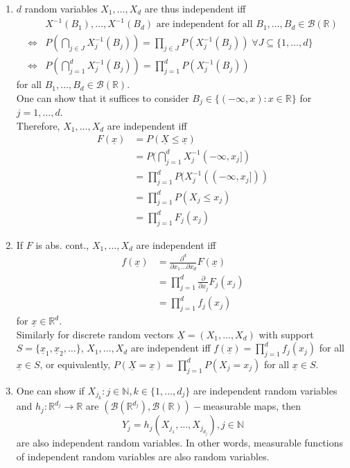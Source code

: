 \documentclass{article}
\newcommand{\R}{\mathbb{R}}
\newcommand{\N}{\mathbb{N}}
\newcommand{\inv}{^{-1}}
\begin{document}
	\begin{myrem}{}{}
		\begin{enumerate}
			\item $d$ random variables $X_1, \dots, X_d$ are thus independent iff
			\begin{align*}
				&X\inv(B_1), \dots, X\inv(B_d)\mbox{ are independent for all }B_1, \dots, B_d\in\mathcal{B}(\R)\\
				\Leftrightarrow&P(\bigcap_{j\in J}X_j\inv(B_j))=\prod_{j\in J}P(X_j\inv(B_j))\;\forall J\subseteq\{1, \dots, d\}\\
				\Leftrightarrow&P(\bigcap_{j=1}^{d}X_j\inv(B_j))=\prod_{j=1}^{d}P(X_j\inv(B_j))
			\end{align*}
			for all $B_1, \dots, B_d\in\mathcal{B}(\R)$.\\
			
			One can show that it suffices to consider $B_j\in\{(-\infty, x) : x\in\R\}$ for $j=1, \dots, d$.\\
			
			Therefore, $X_1, \dots, X_d$ are independent iff
			\begin{align*}
				F(\underline{x})&=P(\underline{X}\leq \underline{x})\\
				&=P(\bigcap_{j=1}^{d}X_j\inv(-\infty, x_j])\\
				&=\prod_{j=1}^{d}P(X_j\inv((-\infty, x_j]))\\
				&=\prod_{j=1}^{d}P(X_j\leq x_j)\\
				&=\prod_{j=1}^{d}F_j(x_j)
			\end{align*}
			
			\item If $F$ is abs. cont., $X_1, \dots, X_d$ are independent iff
				\begin{align*}
					f(\underline{x})&=\frac{\partial^d}{\partial x_1\dots\partial x_d}F(\underline{x})\\
					&=\prod_{j=1}^{d}\frac{\partial}{\partial x_j}F_j(x_j)\\
					&=\prod_{j=1}^{d}f_j(x_j)
				\end{align*}
				for $\underline{x}\in \R^d$.\\
				
				Similarly for discrete random vectors $\underline{X}=(X_1, \dots, X_d)$ with support $S=\{\underline{x}_1, \underline{x}_2, \dots\}$, $X_1, \dots, X_d$ are independent iff $f(\underline{x})=\prod_{j=1}^{d}f_j(x_j)$ for all $\underline{x}\in S$, or equivalently, $P(\underline{X}=\underline{x})=\prod_{j=1}^{d}P(X_j=x_j)$ for all $\underline{x}\in S$.
				
				\item One can show if $X_{j_k} : j\in\N, k\in\{1, \dots, d_j\}$ are independent random variables and $h_j : \R^{d_j}\to\R$ are $(\mathcal{B}(\R^{d_j}), \mathcal{B}(\R))-$measurable maps, then $$Y_j=h_j(X_{j_1}, \dots, X_{j_{d_j}}), j\in\N$$ are also independent random variables. In other words, measurable functions of independent random variables are also random variables.
		\end{enumerate}
	\end{myrem}
	
\end{document}
